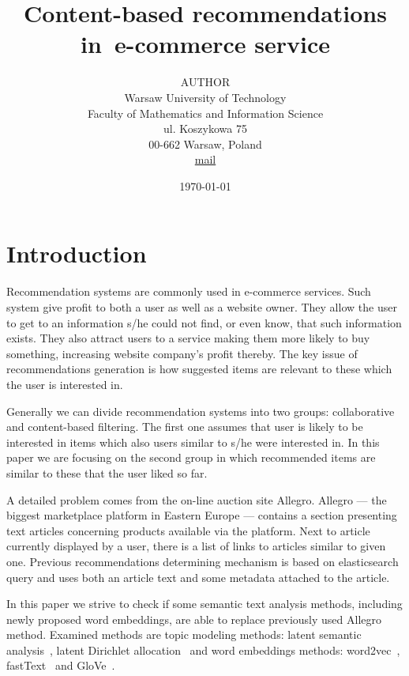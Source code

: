 \documentclass[twoside,twocolumn]{article}
\title{Content-based recommendations in~e-commerce service} %
\author{%
	\textsc{AUTHOR}\\[1ex]%
	\normalsize Warsaw University of Technology \\ %
	\normalsize Faculty of Mathematics and Information Science \\
	\normalsize ul. Koszykowa 75 \\
	\normalsize 00-662 Warsaw, Poland \\
	\normalsize \href{mailto:mail}{mail} %
}
\date{\today} %
\begin{document}
	\maketitle
	\section{Introduction}
	
	Recommendation systems are commonly used in e-commerce services. Such system give profit to both a user as well as a website owner. They allow the user to get to an information s/he could not find, or even know, that such information exists. They also attract users to a service making them more likely to buy something, increasing website company's profit thereby. The key issue of recommendations generation is how suggested items are relevant to these which the user is interested in. 
	
	Generally we can divide recommendation systems into two groups: collaborative and content-based filtering. The first one assumes that user is likely to be interested in items which also users similar to s/he were interested in. In this paper we are focusing on the second group in which recommended items are similar to these that the user liked so far.
	
	A detailed problem comes from the on-line auction site Allegro. Allegro --- the biggest marketplace platform in Eastern Europe --- contains a section presenting text articles concerning products available via the platform. Next to article currently displayed by a user, there is a list of links to articles similar to given one. Previous recommendations determining mechanism is based on elasticsearch query and uses both an article text and some metadata attached to the article.
	
	In this paper we strive to check if some semantic text analysis methods, including newly proposed word embeddings, are able to replace previously used Allegro method. Examined methods are topic modeling methods: latent semantic analysis~\cite{lsa}, latent Dirichlet allocation~\cite{lda} and word embeddings methods: word2vec~\cite{word2vec}, fastText~\cite{fasttext} and GloVe~\cite{glove}.
	
\end{document}
